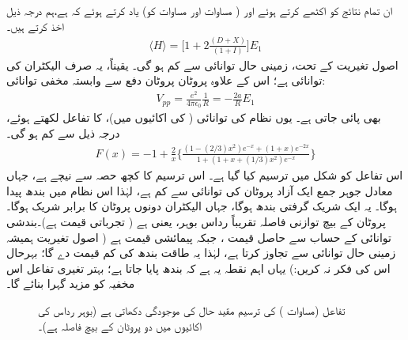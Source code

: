  ان تمام نتائج کو اکٹھے کرتے ہوئے اور ( مساوات  اور مساوات  کو) یاد کرتے
 ہوئے کہ  ہے،ہم درجہ ذیل اخذ کرتے ہیں۔
\begin{align}
\langle H \rangle =\big[1+2\frac{(D+X)}{(1+I)}\big]E_{1} 
\end{align}
 اصول تغیریت کے تحت، زمینی حال توانائی  سے کم ہو گی۔ یقیناً، یہ صرف الیکٹران کی توانائی ہے؛ اس کے علاوہ پروٹان پروٹان دفع سے وابستہ مخفی توانائی:
\begin{align}
V_{pp}=\frac{e^{2}}{4\pi\epsilon_{0}}\frac{1}{R}=-\frac{2a}{R}E_{1} 
\end{align}
 بھی پائی جاتی ہے۔ یوں نظام کی  توانائی (  کی اکائیوں میں)،  کا تفاعل لکھتے ہوئے، درجہ ذیل سے کم ہو گی۔
 \begin{align}\label{مساوات_تغیریت_کل_توانائی_اس_سے_کم}
F(x)=-1+\frac{2}{x}\Big\{\frac{(1-(2/3)x^{2})e^{-x}+(1+x)e^{-2x}}{1+(1+x+(1/3)x^{2})e^{-x}}\Big\} 
\end{align}
 اس تفاعل کو شکل  میں ترسیم کیا گیا ہے۔ اس ترسیم کا کچھ حصہ  سے نیچے ہے، جہاں معادل جوہر جمع ایک آزاد پروٹان کی 
 توانائی  سے کم ہے، لہٰذا اس نظام میں بندھ پیدا ہوگا۔ یہ ایک شریک گرفتی بندھ ہوگا، جہاں الیکٹران دونوں پروٹان کا برابر شریک ہوگا۔ پروٹان کے بیچ توازنی فاصلہ تقریباً  رداس بوہر، یعنی  ہے ( تجرباتی قیمت  ہے)۔بندشی توانائی کے حساب سے حاصل قیمت ، جبکہ پیمائشی قیمت  ہے ( اصول تغیریت ہمیشہ زمینی حال توانائی سے تجاوز کرتا ہے، لہٰذا یہ طاقت بندھ کی کم قیمت دے گا؛ بہرحال اس کی فکر نہ کریں:) یہاں اہم نقطہ یہ ہے کہ بندھ پایا جاتا ہے؛ بہتر تغیری تفاعل اس مخفیہ کو مزید گہرا بنائے گا۔
\begin{figure} \centering
{} 
\caption{تفاعل  (مساوات ) کی ترسیم مقید حال کی موجودگی دکھاتی ہے (بوہر رداس کی اکائیوں میں  دو پروٹان کے بیچ فاصلہ ہے)۔ } 
\label{شکل_تغیریت_مقید_حال} 
\end{figure} 

